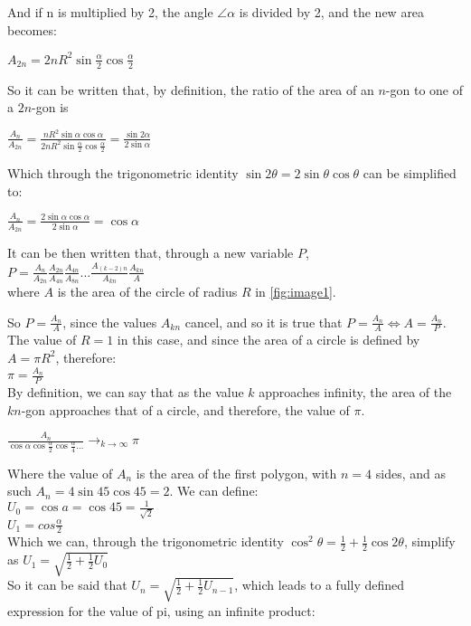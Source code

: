 And if n is multiplied by 2, the angle $\angle \alpha$ is divided by 2,
and the new area becomes:

$A_{2n} = 2n R^2 \sin{\frac{\alpha}{2}} \cos{\frac{\alpha}{2}}$

So it can be written that, by definition, the ratio of
the area of an $n$-gon to one of a $2n$-gon is

$\frac{A_{n}}{A_{2n}} = \frac{n R^2 \sin{\alpha} \cos{\alpha}}{2 n R^2 \sin{\frac{\alpha}{2}} \cos{\frac{\alpha}{2}}} = \frac{\sin{2 \alpha}}{2 \sin{\alpha}}$

Which through the trigonometric identity $\sin{2 \theta} = 2\sin{\theta} \cos{\theta}$ can
be simplified to:

$\frac{A_{n}}{A_{2n}} = \frac{2\sin{\alpha} \cos{\alpha} }{2\sin{\alpha}}  = \cos{\alpha}$

It can be then written that, through a new variable $P$, \\
$P = \frac{A_{n}}{A_{2n}} \frac{A_{2n}}{A_{4n}} \frac{A_{4n}}{A_{8n}} \dots \frac{A_{(k-2)n}}{A_{kn}} \frac{A_{kn}}{A}$ \\
where $A$ is the area of the circle of radius $R$
in \ref{fig:image1}.

So $P = \frac{A_{n}}{A}$, since the values $A_{kn}$ cancel, and
so it is true that $P = \frac{A_{n}}{A} \Leftrightarrow A = \frac{A_{n}}{P}$. The
value of $R = 1$ in this case, and since the area of a circle is defined
by $A = \pi R^2$, therefore: \\
$\pi = \frac{A_{n}}{P}$ \\
By definition, we can say that as the value $k$ approaches infinity, the area of the $kn$-gon
approaches that of a circle, and therefore, the value of $\pi$.

$\frac{A_{n}}{\cos{\alpha} \cos{\frac{\alpha}{2}} \cos{\frac{\alpha}{4}} \dots}
  \to_{k \to \infty} \pi$

Where the value of $A_{n}$ is the area of the first polygon, with $n=4$ sides, and as such
$A_{n} = 4 \sin{45} \cos{45} = 2$. We can define: \\
$U_{0} = \cos{a} = \cos{45} = \frac{1}{\sqrt{2}}$ \\
$U_{1} = cos{\frac{\alpha}{2}}$ \\
Which we can, through the trigonometric identity
$\cos^2{\theta} = \frac{1}{2} + \frac{1}{2} \cos{2\theta}$, simplify as
$U_{1} = \sqrt{\frac{1}{2} + \frac{1}{2} U_{0}}$ \\
So it can be said that $U_{n} = \sqrt{\frac{1}{2} + \frac{1}{2} U_{n - 1}}$, which leads to
a fully defined expression for the value of pi, using an infinite product:

